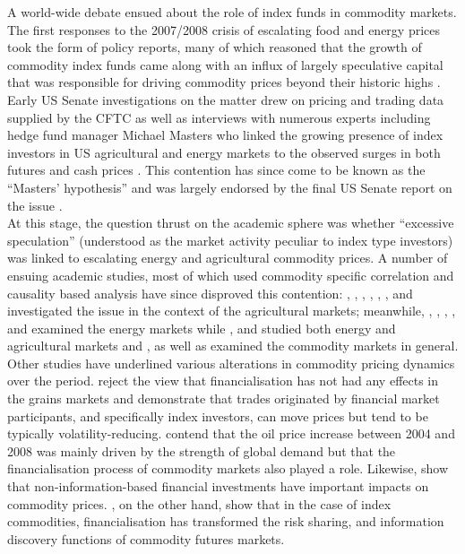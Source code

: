 \documentclass[
  authoryear,
  preprint,
  3p]{elsarticle}
\begin{document}
A world-wide debate ensued about the role of index funds in commodity
markets. The first responses to the 2007/2008 crisis of escalating food
and energy prices took the form of policy reports, many of which
reasoned that the growth of commodity index funds came along with an
influx of largely speculative capital that was responsible for driving
commodity prices beyond their historic highs
\citep{deschutter_food_2010, gilbert_speculative_2010, herman_not_2011, schumann_hunger_2011, unctad_global_2009}.\\
Early US Senate investigations on the matter drew on pricing and trading
data supplied by the CFTC as well as interviews with numerous experts
including hedge fund manager Michael Masters who linked the growing
presence of index investors in US agricultural and energy markets to the
observed surges in both futures and cash prices
\citep{masters_testimony_2008, masters_accidental_2008}. This contention
has since come to be known as the ``Masters' hypothesis'' and was
largely endorsed by the final US Senate report on the issue
\citep{senate_excessive_2009}.\\
At this stage, the question thrust on the academic sphere was whether
``excessive speculation'' (understood as the market activity peculiar to
index type investors) was linked to escalating energy and agricultural
commodity prices. A number of ensuing academic studies, most of which
used commodity specific correlation and causality based analysis have
since disproved this contention: \citet{irwin_devil_2009},
\citet{sanders_adequacy_2010}, \citet{sanders_impact_2011},
\citet{sanders_new_2011}, \citet{irwin_commodity_2013},
\citet{brunetti_commodity_2014}, \citet{hamilton_effects_2015} and
\citet{bruno_financialisation_2017} investigated the issue in the
context of the agricultural markets; meanwhile,
\citet{buyuksahin_speculators_2011}, \citet{tokic_speculation_2012},
\citet{fattouh_role_2013}, \citet{kilian_role_2014},
\citet{knittel_simple_2016} and \citet{manera_modelling_2016} examined
the energy markets while \citet{bohl_does_2013}, \citet{kim_does_2015}
and \citet{boyd_prevalence_2016} studied both energy and agricultural
markets and \citet{irwin_index_2011},
\citet{irwin_financialisation_2012} as well as
\citet{stoll_commodity_2011} examined the commodity markets in general.
Other studies have underlined various alterations in commodity pricing
dynamics over the period. \citet{gilbert_role_2014} reject the view that
financialisation has not had any effects in the grains markets and
demonstrate that trades originated by financial market participants, and
specifically index investors, can move prices but tend to be typically
volatility-reducing. \citet{juvenal_speculation_2015} contend that the
oil price increase between 2004 and 2008 was mainly driven by the
strength of global demand but that the financialisation process of
commodity markets also played a role. Likewise,
\citet{henderson_new_2015} show that non-information-based financial
investments have important impacts on commodity prices.
\citet{cheng_financialisation_2014}, on the other hand, show that in the
case of index commodities, financialisation has transformed the risk
sharing, and information discovery functions of commodity futures
markets.
\end{document}
